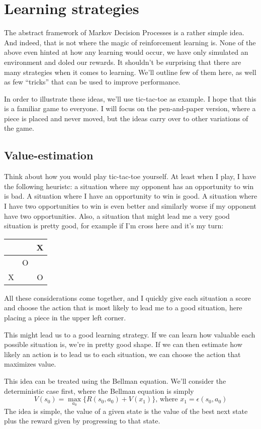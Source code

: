 \documentclass{article}
\theoremstyle{changedot}
\theoremstyle{changedotbreak}
\theoremstyle{nonumberplain}
\begin{document}
\section{Learning strategies}
The abstract framework of Markov Decision Processes is a rather simple idea. And indeed, that is not where the magic of reinforcement learning is. None of the above even hinted at how any learning would occur, we have only simulated an environment and doled our rewards. It shouldn't be surprising that there are many strategies when it comes to learning. We'll outline few of them here, as well as few ``tricks'' that can be used to improve performance.

In order to illustrate these ideas, we'll use tic-tac-toe as example. I hope that this is a familiar game to everyone. I will focus on the pen-and-paper version, where a piece is placed and never moved, but the ideas carry over to other variations of the game.

\subsection{Value-estimation}
Think about how you would play tic-tac-toe yourself. At least when I play, I have the following heuristc: a situation where my opponent has an opportunity to win is bad. A situation where I have an opportunity to win is good. A situation where I have two opportunities to win is even better and similarly worse if my opponent have two opportunities. Also, a situation that might lead me a very good situation is pretty good, for example if I'm cross here and it's my turn:

\begin{tabular}{c|c|c}
    &   & X \\ \hline
    & O &   \\ \hline
  X &   & O
\end{tabular}

All these considerations come together, and I quickly give each situation a score and choose the action that is most likely to lead me to a good situation, here placing a piece in the upper left corner.

This might lead us to a good learning strategy. If we can learn how valuable each possible situation is, we're in pretty good shape. If we can then estimate how likely an action is to lead us to each situation, we can choose the action that maximizes value.

This idea can be treated using the Bellman equation. We'll consider the deterministic case first, where the Bellman equation is simply
\[V(s_{0}) = \max_{a_{0}} \{R(s_{0}, a_{0}) + V(x_{1}) \} \text{, where } x_{1} = \epsilon(s_{0}, a_{0})\]
The idea is simple, the value of a given state is the value of the best next state plus the reward given by progressing to that state. 
\end{document}
